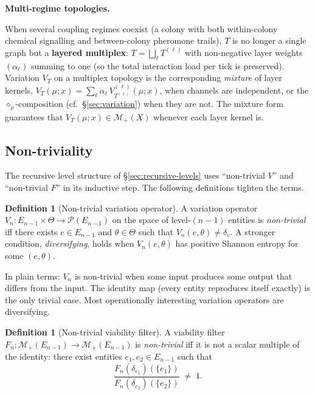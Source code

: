 \documentclass[journal]{IEEEtran}
\theoremstyle{plain}
\theoremstyle{definition}
\newtheorem{definition}[theorem]{Definition}
\theoremstyle{plain}
\newcounter{topic}[subsection]
\newcommand{\topic}[1]{%
  \refstepcounter{topic}%
  \par\smallskip\noindent\textbf{#1.}\ }
\newcommand{\Pmeas}{\mathcal{P}}
\newcommand{\Mplus}{\mathcal{M}_{+}}
\begin{document}
\topic{Multi-regime topologies}\label{sec:multi-regime-topologies}

When several coupling regimes coexist (a colony with both within-colony
chemical signalling and between-colony pheromone trails), $T$ is no longer a
single graph but a \textbf{layered multiplex}:
$T = \bigsqcup_\ell T^{(\ell)}$ with non-negative layer weights
$(\alpha_\ell)$ summing to one (so the total interaction load per tick is
preserved). Variation $V_T$ on a multiplex topology is the corresponding
\emph{mixture} of layer kernels,
$V_T(\mu;x) = \sum_\ell \alpha_\ell\, V^{(\ell)}_{T^{(\ell)}}(\mu;x)$, when
channels are independent, or the $\diamond_\rho$-composition
(cf.\ \S\ref{sec:variation}) when they are not. The mixture form
guarantees that $V_T(\mu;x) \in \Mplus(X)$ whenever each layer kernel is.

\subsection{Non-triviality}\label{sec:nontriviality}

The recursive level structure of \S\ref{sec:recursive-levels} uses
``non-trivial $V$'' and ``non-trivial $F$'' in its inductive step. The
following definitions tighten the terms.

\begin{definition}[Non-trivial variation operator]\label{def:vnontriv}
A variation operator $V_n : E_{n-1} \times \Theta \to \Pmeas(E_{n-1})$
on the space of level-$(n{-}1)$ entities is \emph{non-trivial} iff there
exists $e \in E_{n-1}$ and $\theta \in \Theta$ such that
$V_n(e, \theta) \neq \delta_e$. A stronger condition, \emph{diversifying},
holds when $V_n(e, \theta)$ has positive Shannon entropy for some
$(e, \theta)$.
\end{definition}

In plain terms: $V_n$ is non-trivial when some input produces some
output that differs from the input. The identity map (every entity
reproduces itself exactly) is the only trivial case. Most operationally
interesting variation operators are diversifying.

\begin{definition}[Non-trivial viability filter]\label{def:fnontriv}
A viability filter $F_n : \Mplus(E_{n-1}) \to \Mplus(E_{n-1})$ is
\emph{non-trivial} iff it is not a scalar multiple of the identity:
there exist entities $e_1, e_2 \in E_{n-1}$ such that
\[
  \frac{F_n(\delta_{e_1})(\{e_1\})}{F_n(\delta_{e_2})(\{e_2\})} \;\neq\; 1.
\]
\end{definition}
\end{document}
